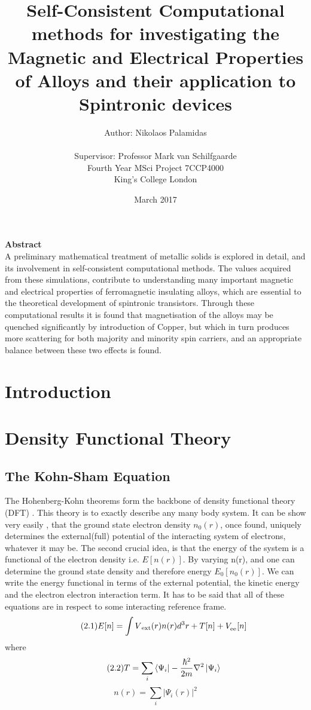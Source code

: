 \documentclass[12pt]{article}
\title{Self-Consistent Computational methods for investigating the Magnetic and Electrical Properties of Alloys and their application to Spintronic devices}
\author{Author: Nikolaos Palamidas \\\\ Supervisor: Professor Mark van Schilfgaarde\\Fourth Year MSci Project 7CCP4000 \\King's College London}
\date{March 2017}
\begin{document}
\maketitle
\clearpage
\thispagestyle{plain}
\begin{center}
    
    \vspace{0.9cm}
    \textbf{Abstract} 
   \\
   A preliminary mathematical treatment of metallic solids is explored in detail, and its involvement in self-consistent computational methods. The values acquired from these simulations, contribute to understanding many important magnetic and electrical properties of ferromagnetic insulating alloys, which are essential to the theoretical development of spintronic transistors. Through these computational results it is found that magnetisation of the alloys may be quenched significantly by introduction of Copper, but which in turn produces more scattering for both majority and minority spin carriers, and an appropriate balance between these two effects is found. 
\end{center}
\clearpage
\tableofcontents
\clearpage

\section{Introduction}
\section{Density Functional Theory}

\subsection{The Kohn-Sham Equation}
The Hohenberg-Kohn theorems form the backbone of density functional theory (DFT) \cite{inhom}. This theory is to exactly describe any many body system. It can be show very easily \cite{martin}, that the ground state electron density $n_0(r)$, once found, uniquely determines the external(full) potential of the interacting system of electrons, whatever it may be. The second crucial idea, is that the energy of the system is a functional of the electron density i.e. $E[n(r)]$. By varying n(r), and one can determine the ground state density and therefore energy $E_0[n_0(r)]$.
We can write the energy functional in terms of the external potential, the kinetic energy and the electron electron interaction term. It has to be said that all of these equations are in respect to some interacting reference frame.
\begin{equation} \label{2.1} \tag{2.1}
E[n]=\int V\textsubscript{ext}(r)n(r)d^3r + T[n] + V_\textsubscript{ee}[n]
\end{equation}
where 
\begin{equation} \label{2.2} \tag{2.2}
T=\sum_{i} \bra{\Psi_i}-\frac{\hbar^2}{2m}\nabla ^2 \ket{\Psi_i} 
\end{equation}
\begin{equation} \label{2.3} \tag{2.3}
n(r)=\sum_{i} | \Psi_i(r) |^2 
\end{equation}
\end{document}
